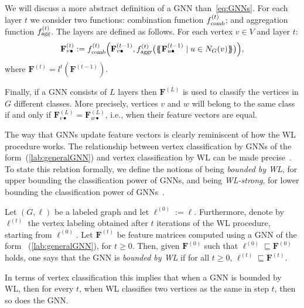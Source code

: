 We will discuss a more abstract definition of a GNN than~\eqref{eq:GNNs}.
For each layer $t$ we consider two functions:
combination function $f_{\textsl{comb}}^{(t)}$; and aggregation function
$f_{\textsl{agg}}^{(t)}$. The layers are defined as follows. For each vertex $v\in V$ and layer $t$:
\begin{equation}
\mathbf{F}^{(t)}_{v\bullet}:=
f_{\textsl{comb}}^{(t)}\Bigl(
\mathbf{F}_{v\bullet}^{(t-1)},f_{\textsl{aggr}}^{(t)}\bigl(\{\!\!\{ \mathbf{F}^{(t-1)}_{u\bullet} \mathrel{\mid} u \in N_G(v) \}\!\!\}\bigr)
\Bigr), \label{lab:generalGNN}
\end{equation}
where $\mathbf{F}^{(t)} = l^{t}(\mathbf{F}^{(t-1)})$.


Finally, if a GNN consists of $L$ layers then
$\mathbf{F}^{(L)}$ is used to classify the vertices in $G$ different classes. More precisely, vertices $v$ and $w$ will belong to the same class if and only if 
$\mathbf{F}^{(L)}_{v\bullet}=\mathbf{F}^{(L)}_{w\bullet}$, i.e., when their feature vectors are equal.

The way that GNNs update feature vectors is clearly reminiscent of how the WL procedure works. The relationship between vertex classification by GNNs of the form~(\ref{lab:generalGNN}) and vertex classification by WL can be made precise~\cite{grohewl,DBLP:conf/iclr/XuHLJ19}. To state this relation formally, we define the notions of being \textit{bounded by WL}, for upper bounding the classification power of GNNs, and being \textit{WL-strong}, for lower bounding the classification power of GNNs~\cite{grohewl}. 

\begin{definition}[Bounded by WL]\normalfont\label{def:wlupper}
Let $(G,\pmb{\ell})$ be a labeled graph and let $\pmb{\ell}^{(0)}:=\pmb{\ell}$. Furthermore, denote by 
$\pmb{\ell}^{(t)}$ the vertex labeling obtained after $t$ iterations of the WL procedure, starting from $\pmb{\ell}^{(0)}$. Let $\mathbf{F}^{(t)}$ be feature matrices computed using a GNN of the form ~(\ref{lab:generalGNN}), for $t\geq 0$. Then, given $\mathbf{F}^{(0)}$ such that $\pmb{\ell}^{(0)}\sqsubseteq \mathbf{F}^{(0)}$ holds, one says that the GNN  is \textit{bounded by WL} if for all $t\geq 0$, 
$\pmb{\ell}^{(t)}\sqsubseteq \mathbf{F}^{(t)}$.
\end{definition}
In terms of vertex classification this implies that when a GNN is bounded by WL, then 
for every $t$, when WL classifies two vertices as the same in step $t$, then so does the GNN. 

